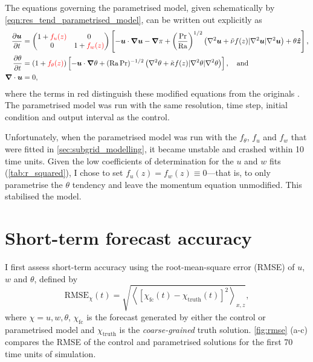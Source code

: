 \documentclass[../main.tex]{subfiles}
\begin{document}
The equations governing the parametrised model, given schematically by
\cref{eqn:res_tend_parametrised_model}, can be written out explicitly as
\begin{align*}
    \frac{\partial \bm{u}}{\partial t} &=
        \begin{pmatrix}
            1 + {\color{red} f_u(z)} & 0 \\
            0 & 1 + {\color{red} f_w(z)}
        \end{pmatrix}
        \left[
            -\bm{u} \cdot \bm{\nabla} \bm{u}
            -\bm{\nabla} \pi
            + \left( \frac{\mathrm{Pr}}{\mathrm{Ra}}\right)^{1/2}
            \left(
                \nabla^2 \bm{u}
                + \tilde{\nu} f(z) |\nabla^2 \bm{u}| \nabla^2 \bm{u}
            \right)
            + \theta \bm{\hat{z}}
        \right], \\
    \frac{\partial \theta}{\partial t} &=
        (1 + {\color{red} f_\theta(z)}) \left[
            -\bm{u} \cdot \bm{\nabla} \theta
            + (\mathrm{Ra}\,\mathrm{Pr})^{-1/2}
            \left(
                \nabla^2 \theta
                + \tilde{\kappa} f(z) |\nabla^2 \theta| \nabla^2 \theta
            \right)
        \right], \quad \text{and} \\
    \bm{\nabla} \cdot \bm{u} &= 0,
\end{align*}
where the terms in red distinguish these modified equations from the originals
. The
parametrised model was run with the same resolution, time step, initial
condition and output interval as the control.

Unfortunately, when the parametrised model was run with the $f_\theta$,
$f_u$ and $f_w$ that were fitted in \cref{sec:subgrid_modelling}, it
became unstable and crashed within 10 time units. Given the low coefficients
of determination for the $u$ and $w$ fits (\cref{tab:r_squared}), I
chose to set $f_u(z) = f_w(z) \equiv 0$---that is, to only parametrise the
$\theta$ tendency and leave the momentum equation unmodified. This stabilised
the model.

\newpage
\section{Short-term forecast accuracy}
\label{sec:forecast}
I first assess short-term accuracy using the root-mean-square error (RMSE)
of $u$, $w$ and $\theta$, defined by
\[
    \mathrm{RMSE}_\chi(t) = \sqrt{\left\langle
        [\chi_\mathrm{fc}(t) - \chi_\mathrm{truth}(t)]^2
    \right\rangle _{x,z}},
\]
where $\chi = u, w, \theta$, $\chi_\mathrm{fc}$ is the forecast generated by
either the control or parametrised model and $\chi_\mathrm{truth}$ is the
\emph{coarse-grained} truth solution. \cref{fig:rmse} (a-c) compares the RMSE
of the control and parametrised solutions for the first 70 time units of
simulation.
\end{document}
